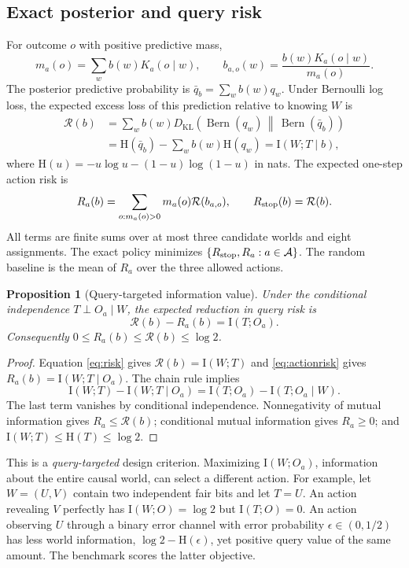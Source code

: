 \documentclass[10pt]{article}
\newtheorem{proposition}{Proposition}
\newcommand{\risk}{\mathcal R}
\newcommand{\ent}{\mathrm H}
\newcommand{\info}{\mathrm I}
\newcommand{\kl}{D_{\mathrm{KL}}}
\begin{document}
\subsection{Exact posterior and query risk}
For outcome $o$ with positive predictive mass,
\begin{equation}
 m_a(o)=\sum_w b(w)K_a(o\mid w),\qquad
 b_{a,o}(w)=\frac{b(w)K_a(o\mid w)}{m_a(o)}.
 \label{eq:bayes}
\end{equation}
The posterior predictive probability is $\bar q_b=\sum_w b(w)q_w$. Under Bernoulli log loss, the expected excess loss of this prediction relative to knowing $W$ is
\begin{align}
 \risk(b)
 &=\sum_w b(w)\kl\!\left(
 \operatorname{Bern}(q_w)\,\middle\|\,
 \operatorname{Bern}(\bar q_b)\right) \nonumber\\
 &=\ent(\bar q_b)-\sum_w b(w)\ent(q_w)
 =\info(W;T\mid b),
 \label{eq:risk}
\end{align}
where $\ent(u)=-u\log u-(1-u)\log(1-u)$ in nats. The expected one-step action risk is
\begin{equation}
 R_a(b)=\sum_{o:m_a(o)>0}m_a(o)\risk(b_{a,o}),\qquad
 R_{\rm stop}(b)=\risk(b).
 \label{eq:actionrisk}
\end{equation}
All terms are finite sums over at most three candidate worlds and eight assignments. The exact policy minimizes $\{R_{\rm stop},R_a:a\in\mathcal A\}$. The random baseline is the mean of $R_a$ over the three allowed actions.

\begin{proposition}[Query-targeted information value]
Under the conditional independence $T\perp O_a\mid W$, the expected reduction in query risk is
\begin{equation}
 \risk(b)-R_a(b)=\info(T;O_a).
 \label{eq:identity}
\end{equation}
Consequently $0\le R_a(b)\le\risk(b)\le\log 2$.
\end{proposition}
\begin{proof}
Equation \eqref{eq:risk} gives $\risk(b)=\info(W;T)$ and \eqref{eq:actionrisk} gives $R_a(b)=\info(W;T\mid O_a)$. The chain rule implies
\[
 \info(W;T)-\info(W;T\mid O_a)
 =\info(T;O_a)-\info(T;O_a\mid W).
\]
The last term vanishes by conditional independence. Nonnegativity of mutual information gives $R_a\le\risk(b)$; conditional mutual information gives $R_a\ge0$; and $\info(W;T)\le\ent(T)\le\log 2$.
\end{proof}

This is a \emph{query-targeted} design criterion. Maximizing $\info(W;O_a)$, information about the entire causal world, can select a different action. For example, let $W=(U,V)$ contain two independent fair bits and let $T=U$. An action revealing $V$ perfectly has $\info(W;O)=\log 2$ but $\info(T;O)=0$. An action observing $U$ through a binary error channel with error probability $\epsilon\in(0,1/2)$ has less world information, $\log 2-\ent(\epsilon)$, yet positive query value of the same amount. The benchmark scores the latter objective.
\end{document}
